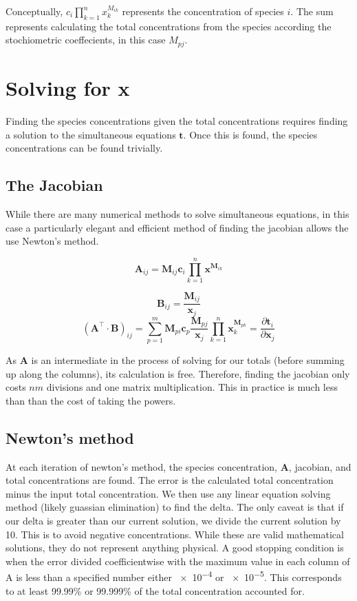 \documentclass{article}
\newcommand{\matr}[1]{\bm{#1}}
\newcommand{\vect}[1]{\bm{#1}}
\begin{document}
Conceptually, $c_i\prod_{k=1}^{n} x_k^{M_{ik}}$ represents the concentration of species $i$. The sum represents calculating the total concentrations from the species according the stochiometric coeffecients, in this case $M_{pj}$.


\section{Solving for x}
Finding the species concentrations given the total concentrations requires finding a solution to the simultaneous equations $\vect{t}$. Once this is found, the species concentrations can be found trivially.

\subsection{The Jacobian}
While there are many numerical methods to solve simultaneous equations, in this case a particularly elegant and efficient method of finding the jacobian allows the use Newton's method.

\begin{equation*}
  \matr{A}_{ij}=\matr{M}_{ij} \vect{c}_i \prod_{k=1}^{n} \vect{x}^{\matr{M}_{ik}}
\end{equation*}

\begin{equation*}
  \matr{B}_{ij}=\frac{\matr{M}_{ij}}{\vect{x}_j}
\end{equation*}
\begin{equation*}
  \left(\matr{A}^\intercal\cdot\matr{B}\right)_{ij}=\sum_{p=1}^{m} \matr{M}_{pi} \vect{c}_p \frac{\matr{M}_{pj}}{\vect{x}_j} \prod_{k=1}^{n} \vect{x}_k^{\matr{M}_{pk}}=\frac{\partial \vect{t}_i}{\partial \vect{x}_j}
\end{equation*}

As $\vect{A}$ is an intermediate in the process of solving for our totals (before summing up along the columns), its calculation is free. Therefore, finding the jacobian only costs $nm$ divisions and one matrix multiplication. This in practice is much less than than the cost of taking the powers.

\subsection{Newton's method}
At each iteration of newton's method, the species concentration, $\matr{A}$, jacobian, and total concentrations are found. The error is the calculated total concentration minus the input total concentration. We then use any linear equation solving method (likely guassian elimination) to find the delta. The only caveat is that if our delta is greater than our current solution, we divide the current solution by 10. This is to avoid negative concentrations. While these are valid mathematical solutions, they do not represent anything physical. A good stopping condition is when the error divided coefficientwise with the maximum value in each column of A is less than a specified number either \num{e-4} or \num{e-5}. This corresponds to at least 99.99\% or 99.999\% of the total concentration accounted for.
\end{document}
